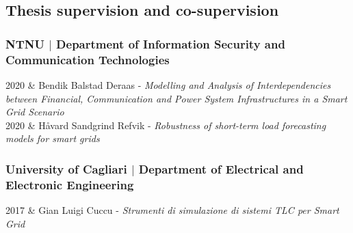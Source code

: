 \documentclass[11pt]{article}
\begin{document}
\subsection*{Thesis supervision and co-supervision}
\subsubsection*{NTNU $\mid$ Department of Information Security and Communication Technologies}
\begin{tabularx}{\linewidth}{\twocols}
  2020 & Bendik Balstad Deraas  - \textit{Modelling and Analysis of Interdependencies between Financial, Communication and Power System
  Infrastructures in a Smart Grid Scenario}\\ 
  2020 & Håvard Sandgrind Refvik - \textit{Robustness of short-term load forecasting models for smart grids}
\end{tabularx}
\subsubsection*{University of Cagliari $\mid$ Department of Electrical and Electronic Engineering}
\begin{tabularx}{\linewidth}{\twocols}
2017 & Gian Luigi Cuccu - \textit{Strumenti di simulazione di sistemi TLC per Smart Grid}\\
\end{tabularx}





\end{document}
